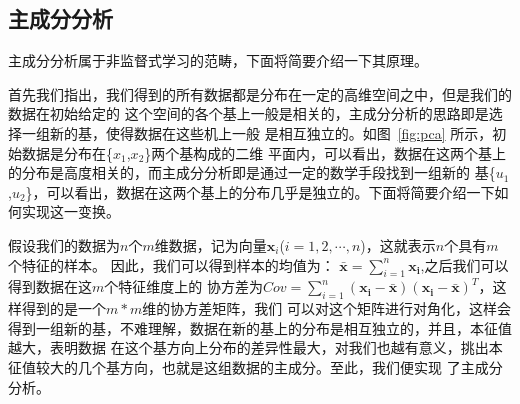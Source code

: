 \documentclass[aps,pre,12pt,preprint,onecolumn,showpacs,showkeys]{revtex4-1}
\begin{document}
\subsection{主成分分析}
主成分分析属于非监督式学习的范畴，下面将简要介绍一下其原理。\par
首先我们指出，我们得到的所有数据都是分布在一定的高维空间之中，但是我们的数据在初始给定的
这个空间的各个基上一般是相关的，主成分分析的思路即是选择一组新的基，使得数据在这些机上一般
是相互独立的。如图~\ref{fig:pca} 所示，初始数据是分布在\{$x_{1}$,$x_{2}$\}两个基构成的二维
平面内，可以看出，数据在这两个基上的分布是高度相关的，而主成分分析即是通过一定的数学手段找到一组新的
基\{$u_{1}$,$u_{2}$\}，可以看出，数据在这两个基上的分布几乎是独立的。下面将简要介绍一下如何实现这一变换。\par
假设我们的数据为$n$个$m$维数据，记为向量$\bm x_{i}$($i=1,2,\cdots,n$)，这就表示$n$个具有$m$个特征的样本。
因此，我们可以得到样本的均值为：
$\bm{\bar{x}}=\sum_{i=1}^{n}\bm{x_{i}}$,之后我们可以得到数据在这$m$个特征维度上的
协方差为$Cov=\sum_{i=1}^{n}\bm{(x_{i}-\bar{x})(x_{i}-\bar{x})}^{T}$，这样得到的是一个$m*m$维的协方差矩阵，我们
可以对这个矩阵进行对角化，这样会得到一组新的基，不难理解，数据在新的基上的分布是相互独立的，并且，本征值越大，表明数据
在这个基方向上分布的差异性最大，对我们也越有意义，挑出本征值较大的几个基方向，也就是这组数据的主成分。至此，我们便实现
了主成分分析。
\end{document}
